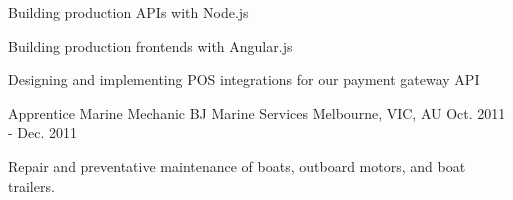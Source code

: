 \begin{cventries}
    {
      \begin{cvitems} %
        \item {Building production APIs with Node.js}
        \item {Building production frontends with Angular.js}
        \item {Designing and implementing POS integrations for our payment gateway API}
      \end{cvitems}
    }
  \cventry
    {Apprentice Marine Mechanic}
    {BJ Marine Services}
    {Melbourne, VIC, AU}
    {Oct. 2011 - Dec. 2011}
    {
      \begin{cvitems}
        \item {Repair and preventative maintenance of  boats, outboard motors, and boat trailers.}
      \end{cvitems}
    }


\end{cventries}
